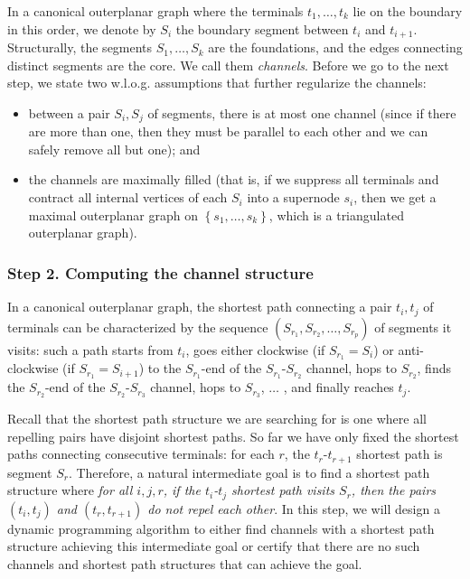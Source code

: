 \documentclass[11pt]{article}
\newcommand{\set}[1]{\left\{ #1 \right\}}
\begin{document}
In a canonical outerplanar graph where the terminals $t_1,\ldots,t_k$ lie on the boundary in this order, we denote by $S_i$ the boundary segment between $t_{i}$ and $t_{i+1}$. Structurally, the segments $S_1,\ldots,S_k$ are the foundations, and the edges connecting distinct segments are the core. We call them \emph{channels}. Before we go to the next step, we state two w.l.o.g. assumptions that further regularize the channels:
\begin{itemize}
    \item between a pair $S_i,S_j$ of segments, there is at most one channel (since if there are more than one, then they must be parallel to each other and we can safely remove all but one); and
    \item the channels are maximally filled (that is, if we suppress all terminals and contract all internal vertices of each $S_i$ into a supernode $s_i$, then we get a maximal outerplanar graph on $\set{s_1,\ldots,s_k}$, which is a triangulated outerplanar graph).
\end{itemize}


\subsubsection*{Step 2. Computing the channel structure}

In a canonical outerplanar graph, the shortest path connecting a pair $t_i,t_j$ of terminals can be characterized by the sequence $(S_{r_1},S_{r_2},\ldots,S_{r_p})$ of segments it visits: such a path starts from $t_i$, goes either clockwise (if $S_{r_1}=S_{i}$) or anti-clockwise (if $S_{r_1}=S_{i+1}$) to the $S_{r_1}$-end of the $S_{r_1}$-$S_{r_2}$ channel, hops to $S_{r_2}$, finds the $S_{r_2}$-end of the $S_{r_2}$-$S_{r_3}$ channel, hops to $S_{r_3}$, $\ldots$ , and finally reaches $t_j$.

Recall that the shortest path structure we are searching for is one where all repelling pairs have disjoint shortest paths. 
So far we have only fixed the shortest paths connecting consecutive terminals: for each $r$, the $t_r$-$t_{r+1}$ shortest path is segment $S_r$. Therefore, a natural intermediate goal is to find a shortest path structure where \emph{for all $i,j,r$, if the $t_i$-$t_j$ shortest path visits $S_r$, then the pairs $(t_i,t_j)$ and $(t_r,t_{r+1})$ do not repel each other}.
%
In this step, we will design a dynamic programming algorithm to either find channels with a shortest path structure achieving this intermediate goal or certify that there are no such channels and shortest path structures that can achieve the goal. 
\end{document}
